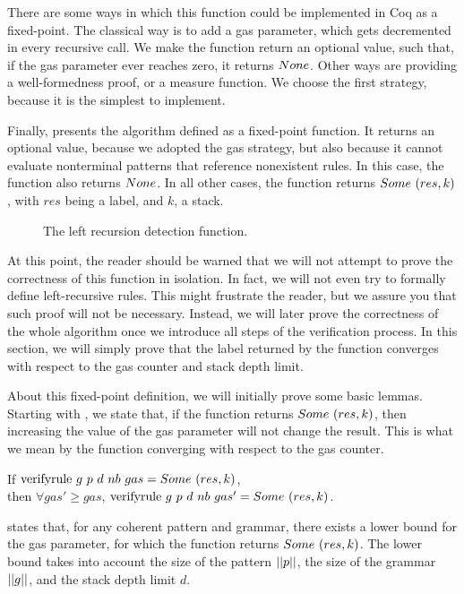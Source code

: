 There are some ways in which this function
could be implemented in Coq as a fixed-point.
The classical way is to add a gas parameter,
which gets decremented in every recursive call.
We make the function return an optional value,
such that, if the gas parameter ever reaches zero,
it returns $None$.
Other ways are providing a well-formedness proof,
or a measure function.
We choose the first strategy,
because it is the simplest to implement.

Finally,
 presents the algorithm
defined as a fixed-point function.
It returns an optional value,
because we adopted the gas strategy,
but also because it cannot evaluate
nonterminal patterns that
reference nonexistent rules.
In this case,
the function also returns $None$.
In all other cases,
the function returns $Some\ (res, k)$,
with $res$ being a label, and $k$, a stack.
\begin{figure}
    \centering
    
    \caption{The left recursion detection function.}
    \label{fig:vr-function}
\end{figure}

At this point,
the reader should be warned that
we will not attempt to prove the correctness
of this function in isolation.
In fact, we will not even try to formally
define left-recursive rules.
This might frustrate the reader,
but we assure you that such proof will not be necessary.
Instead,
we will later prove the correctness of the whole algorithm
once we introduce all steps of the verification process.
In this section,
we will simply prove
that the label returned by the function
converges with respect to the gas counter and stack depth limit.

About this fixed-point definition,
we will initially prove some basic lemmas.
Starting with ,
we state that, if the function returns $Some\ (res, k)$,
then increasing the value of the gas parameter
will not change the result.
This is what we mean by
the function converging
with respect to the gas counter.

\begin{lemma}%
    If $\text{verifyrule}{}\ g\ p\ d\ nb\ gas = Some\ (res, k)$, \\
    then $\forall gas' \ge gas$,
    $\text{verifyrule}{}\ g\ p\ d\ nb\ gas' = Some\ (res, k)$.
    \label{lemma:vr-gas-convergence}
\end{lemma}

 states that,
for any coherent pattern and grammar,
there exists a lower bound for the gas parameter,
for which the function returns $Some\ (res, k)$.
The lower bound
takes into account
the size of the pattern $||p||$,
the size of the grammar $||g||$,
and the stack depth limit $d$.

